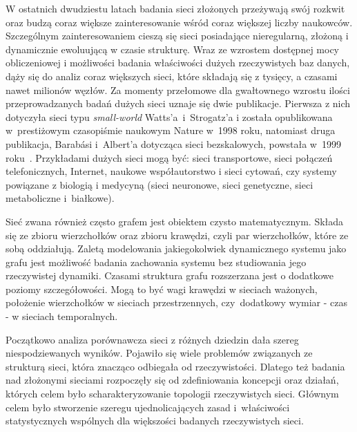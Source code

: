 \documentclass[12pt, oneside, final, openany]{mgr}
\begin{document}
\indent W ostatnich dwudziestu latach badania sieci złożonych przeżywają swój rozkwit oraz budzą coraz większe zainteresowanie wśród coraz większej liczby naukowców. Szczególnym zainteresowaniem cieszą się sieci posiadające nieregularną, złożoną i dynamicznie ewoluującą w czasie strukturę. Wraz ze wzrostem dostępnej mocy obliczeniowej i możliwości badania właściwości dużych rzeczywistych baz danych, dąży się do analiz coraz większych sieci, które składają się z tysięcy, a czasami nawet milionów węzłów. Za momenty przełomowe dla gwałtownego wzrostu ilości przeprowadzanych badań dużych sieci uznaje się dwie publikacje. Pierwsza z nich dotyczyła sieci typu \textit{small-world} Watts'a~i~Strogatz'a i została opublikowana w~prestiżowym czasopiśmie naukowym Nature w~1998 roku, natomiast druga publikacja, Barab{\'a}si i~Albert'a dotycząca sieci bezskalowych, powstała w~1999 roku~\cite{Watts1998, Barabasi1999}. Przykładami dużych sieci mogą być: sieci transportowe, sieci połączeń telefonicznych, Internet, naukowe współautorstwo i sieci cytowań, czy systemy powiązane z biologią i medycyną (sieci neuronowe, sieci genetyczne, sieci metaboliczne i~białkowe). 

\indent Sieć zwana również często grafem jest obiektem czysto matematycznym. Składa się ze zbioru wierzchołków oraz zbioru krawędzi, czyli par wierzchołków, które ze sobą oddziałują. Zaletą modelowania jakiegokolwiek dynamicznego systemu jako grafu jest możliwość badania zachowania systemu bez studiowania jego rzeczywistej dynamiki. Czasami struktura grafu rozszerzana jest o dodatkowe poziomy szczegółowości. Mogą to być wagi krawędzi w sieciach ważonych, położenie wierzchołków w sieciach przestrzennych, czy~dodatkowy wymiar - czas - w sieciach temporalnych.

\indent Początkowo analiza porównawcza sieci z różnych dziedzin dała szereg niespodziewanych wyników. Pojawiło się wiele problemów związanych ze strukturą sieci, która znacząco odbiegała od rzeczywistości. Dlatego też badania nad złożonymi sieciami rozpoczęły się od zdefiniowania koncepcji oraz działań, których celem było scharakteryzowanie topologii rzeczywistych sieci. Głównym celem było stworzenie szeregu ujednolicających zasad i~właściwości statystycznych wspólnych dla większości badanych rzeczywistych sieci. 
\end{document}
